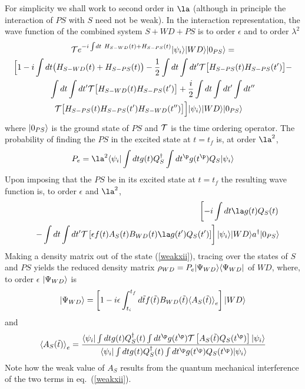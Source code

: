 \documentclass[12pt]{article}
\begin{document}
For simplicity we shall work to second order in $\la$ (although in principle
the interaction of $PS$ with $S$ need not be weak).
In the interaction
representation, the wave function of the combined system $S+WD+PS$ is
to order $\epsilon$ and to order $\lambda^2$
\begin{multline}
{\cal T} e^{-i \int\! dt \ H_{S-WD}(t) + H_{S-PS}(t)}
\ket{\psi_i}\ket{WD}\ket{0_{PS}}=\\
 \Bigl[
1 -i \int dt \bigl( H_{S-WD}(t) + H_{S-PS}(t) \bigr)
-{1 \over 2}
\int dt \int dt^\prime
{\cal T}\bigl[ H_{S-PS}(t)  H_{S-PS}(t^\prime) \bigr]
-\\
\int dt \int dt^\prime
{\cal T}\bigl[ H_{S-WD}(t)  H_{S-PS}(t^\prime) \bigr]
+{i \over 2}
\int dt \int dt^\prime\int dt^{\prime\prime}\\
{\cal T}\bigl[ H_{S-PS}(t)  H_{S-PS}(t^\prime)
 H_{S-WD}(t^{\prime\prime})
\bigr]
\Bigr]
\ket{\psi_i}\ket{WD}\ket{0_{PS}}\quad
\label{weakxi}
\end{multline}
where $\mbox{$ \vert 0_{PS} \rangle $}$ is the ground state of $PS$ and ${\cal T}$ is
the time ordering operator.
The probability of finding the $PS$ in the excited state at $t=t_f$ is,
at order $\la^2$,
\begin{equation}
P_{e}
= \la^2  \bra{\psi_i} \int dt g(t) Q^\dagger_S
\int dt^\p g(t^\p) Q_S \ket{\psi_i}
\end{equation}
Upon imposing that the
$PS$ be in its excited state at $t=t_f$ the
resulting
wave function  is, to order $\epsilon$ and $\la^2$,
\begin{eqnarray}
&&\quad \left [
-i \int dt \la g(t) Q_S(t)  \right.
\nonumber\\
&& \left. -
\int dt \int dt^\prime
{\cal T}
\left[\epsilon f(t) A_S(t) B_{WD}(t) \la g(t^\prime) Q_S(t^\prime)
\right]
\right]
\ket{\psi_i}\ket{WD}a^\dagger\ket{0_{PS}}
\label{weakxii}\end{eqnarray}
Making a density matrix out of the state (\ref{weakxii}),
tracing over the states of $S$ and $PS$
yields the reduced density matrix $\rho_{WD} =
P_{e}\mbox{$ \vert \Psi_{WD} \rangle $}\mbox{$ \langle \Psi_{WD} \vert $}$ of $WD$, where, to order $\epsilon$
$\mbox{$ \vert \Psi_{WD} \rangle $}$ is
\begin{equation}
\mbox{$ \vert \Psi_{WD} \rangle $}=\left[
1 - i \epsilon \int_{t_i}^{t_f} d\tilde t f(\tilde t) B_{WD}(\tilde t)
\mbox{$ \langle A_{S}(\tilde t) \rangle $}_{e} \right] \mbox{$ \vert WD \rangle $}
\label{weakxiii}
\end{equation}
and
\begin{equation}
\bk{A_{S}(\tilde t)}_{e} =
{ \bi \int dt g(t) Q_S^\dagger (t)  \int dt^\p
g(t^\p) {\cal T } \left[ A_S(\tilde t) Q_S(t^\p) \right]
\ki \over \bi \int dt g(t) Q_S^\dagger (t) \int
dt^\p g(t^\p) Q_S(t^\p) \ki} \label{weakxiv} \end{equation}
Note how the weak value of $A_S$ results from the quantum mechanical
interference of the two terms in eq.~(\ref{weakxii}).
\end{document}
